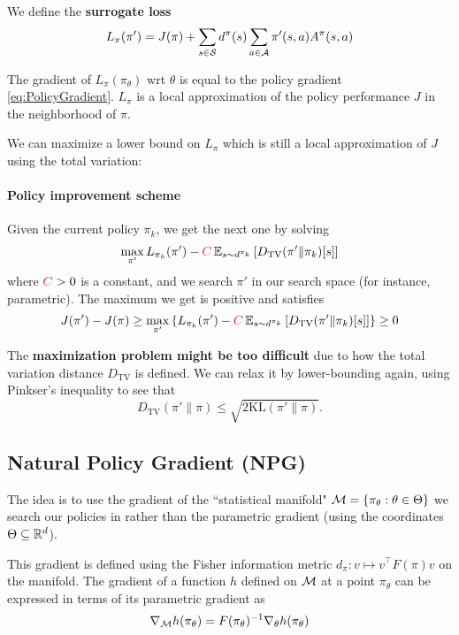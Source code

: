 \documentclass[../course-notes.tex]{subfiles}
\begin{document}
We define the \textbf{\bluefont surrogate loss}
\begin{equation}
	L_\pi(\pi') = J(\pi) + \sum_{s\in\mathcal{S}} d^\pi(s) \sum_{a\in\mathcal{A}} \pi'(s,a)	A^\pi(s,a)
\end{equation}

The gradient of $L_\pi(\pi_\theta)$ wrt $\theta$ is equal to the policy gradient \eqref{eq:PolicyGradient}. $L_\pi$ is a local approximation of the policy performance $J$ in the neighborhood of $\pi$.

We can maximize a lower bound on $L_\pi$ which is still a local approximation of $J$ using the total variation:

\paragraph{Policy improvement scheme} Given the current policy $\pi_k$, we get the next one by solving
\[
	\max_{\pi'} L_{\pi_k}(\pi') - {\redfont C}
	\EE_{s\sim d^{\pi_k}}\left[
	D_{\mathrm{TV}}(\pi' \| \pi_k)[s]
	\right]
\]
where ${\redfont C} > 0$ is a constant, and we search $\pi'$ in our search space (for instance, parametric). The maximum we get is positive and satisfies
\[
	J(\pi') - J(\pi) \geq
	\max_{\pi'} \left\{ L_{\pi_k}(\pi') - {\redfont C}
	\EE_{s\sim d^{\pi_k}}\left[
	D_{\mathrm{TV}}(\pi' \| \pi_k)[s]
	\right] \right\}
	\geq 0
\]

The \textbf{\redfont maximization problem might be too difficult} due to how the total variation distance $D_\mathrm{TV}$ is defined. We can relax it by lower-bounding again, using Pinkser's inequality to see that
\[
	D_\mathrm{TV}(\pi'\|\pi) \leq \sqrt{2\mathrm{KL}(\pi'\|\pi)}.
\]


\subsection{Natural Policy Gradient (NPG)}

The idea is to use the gradient of the ``statistical manifold" $\mathcal{M} = \{\pi_\theta:\theta\in\Theta\}$ we search our policies in rather than the parametric gradient (using the coordinates $\Theta \subseteq \mathbb{R}^d$).

This gradient is defined using the Fisher information metric $d_{\pi}:v \mapsto v^\intercal F(\pi) v$ on the manifold. The gradient of a function $h$ defined on $\mathcal{M}$ at a point $\pi_\theta$ can be expressed in terms of its parametric gradient as
\[
	\nabla_{\mathcal{M}} h(\pi_\theta) = F(\pi_\theta)^{-1}\nabla_\theta h(\pi_\theta)
\]
\end{document}
